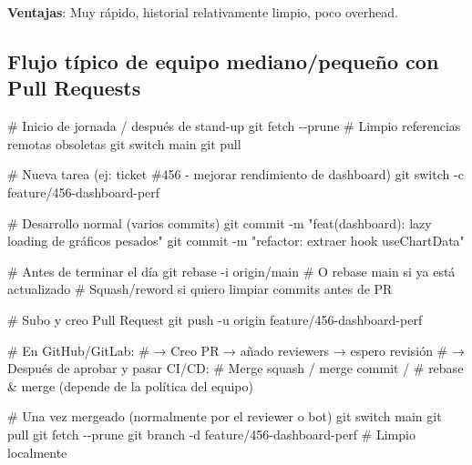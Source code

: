 \documentclass[
  doc,
  floatsintext,
  longtable,
  a4paper,
  nolmodern,
  notxfonts,
  notimes,
  12pt,
  colorlinks=true,linkcolor=blue,citecolor=blue,urlcolor=blue]{apa7}
\newenvironment{Shaded}{\begin{snugshade}}{\end{snugshade}}
\newcommand{\AttributeTok}[1]{\textcolor[rgb]{0.40,0.45,0.13}{#1}}
\newcommand{\CommentTok}[1]{\textcolor[rgb]{0.37,0.37,0.37}{#1}}
\newcommand{\FunctionTok}[1]{\textcolor[rgb]{0.28,0.35,0.67}{#1}}
\newcommand{\NormalTok}[1]{\textcolor[rgb]{0.00,0.23,0.31}{#1}}
\newcommand{\StringTok}[1]{\textcolor[rgb]{0.13,0.47,0.30}{#1}}
\begin{document}
\textbf{Ventajas}: Muy rápido, historial relativamente limpio, poco
overhead.

\subsection{Flujo típico de equipo mediano/pequeño con Pull
Requests}\label{flujo-tuxedpico-de-equipo-medianopequeuxf1o-con-pull-requests}

\begin{Shaded}
\begin{Highlighting}[]
\CommentTok{\# Inicio de jornada / después de stand{-}up}
\FunctionTok{git}\NormalTok{ fetch }\AttributeTok{{-}{-}prune}          \CommentTok{\# Limpio referencias remotas obsoletas}
\FunctionTok{git}\NormalTok{ switch main}
\FunctionTok{git}\NormalTok{ pull}

\CommentTok{\# Nueva tarea (ej: ticket \#456 {-} mejorar rendimiento de dashboard)}
\FunctionTok{git}\NormalTok{ switch }\AttributeTok{{-}c}\NormalTok{ feature/456{-}dashboard{-}perf}

\CommentTok{\# Desarrollo normal (varios commits)}
\FunctionTok{git}\NormalTok{ commit }\AttributeTok{{-}m} \StringTok{"feat(dashboard): lazy loading de gráficos pesados"}
\FunctionTok{git}\NormalTok{ commit }\AttributeTok{{-}m} \StringTok{"refactor: extraer hook useChartData"}

\CommentTok{\# Antes de terminar el día}
\FunctionTok{git}\NormalTok{ rebase }\AttributeTok{{-}i}\NormalTok{ origin/main    }\CommentTok{\# O rebase main si ya está actualizado}
\CommentTok{\# Squash/reword si quiero limpiar commits antes de PR}

\CommentTok{\# Subo y creo Pull Request}
\FunctionTok{git}\NormalTok{ push }\AttributeTok{{-}u}\NormalTok{ origin feature/456{-}dashboard{-}perf}

\CommentTok{\# En GitHub/GitLab:}
\CommentTok{\#   → Creo PR → añado reviewers → espero revisión}
\CommentTok{\#   → Después de aprobar y pasar CI/CD:}
\CommentTok{\#     Merge squash / merge commit / }
\CommentTok{\#     rebase \& merge (depende de la política del equipo)}

\CommentTok{\# Una vez mergeado (normalmente por el reviewer o bot)}
\FunctionTok{git}\NormalTok{ switch main}
\FunctionTok{git}\NormalTok{ pull}
\FunctionTok{git}\NormalTok{ fetch }\AttributeTok{{-}{-}prune}
\FunctionTok{git}\NormalTok{ branch }\AttributeTok{{-}d}\NormalTok{ feature/456{-}dashboard{-}perf   }\CommentTok{\# Limpio localmente}
\end{Highlighting}
\end{Shaded}
\end{document}
